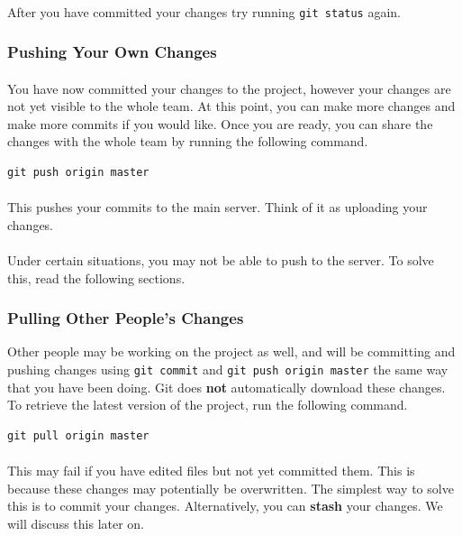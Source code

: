 \documentclass[11pt]{article}
\begin{document}
\paragraph{}
After you have committed your changes try running \lstinline{git status} again.
\subsubsection{Pushing Your Own Changes}
\paragraph{}
You have now committed your changes to the project, however your changes are not yet visible to the whole team. At this point, you can make more changes and make more commits if you would like. Once you are ready, you can share the changes with the whole team by running the following command.
\begin{lstlisting}
git push origin master
\end{lstlisting}
\paragraph{}
This pushes your commits to the main server. Think of it as uploading your changes.
\paragraph{}
Under certain situations, you may not be able to push to the server. To solve this, read the following sections.
\subsubsection{Pulling Other People's Changes}
Other people may be working on the project as well, and will be committing and pushing changes using \lstinline{git commit} and \lstinline{git push origin master} the same way that you have been doing. Git does \textbf{not} automatically download these changes. To retrieve the latest version of the project, run the following command.
\begin{lstlisting}
git pull origin master
\end{lstlisting}
\paragraph{}
This may fail if you have edited files but not yet committed them. This is because these changes may potentially be overwritten. The simplest way to solve this is to commit your changes. Alternatively, you can \textbf{stash} your changes. We will discuss this later on.
\end{document}
